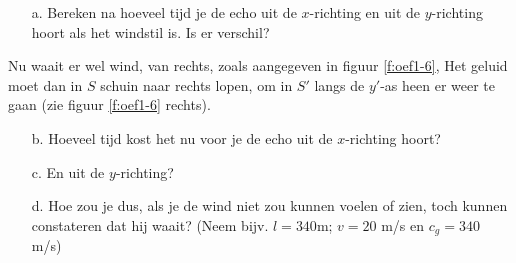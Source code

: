 \begin{itemize}
\item [a.]
  Bereken na hoeveel tijd je de echo uit de $x$-richting en 
  uit de $y$-richting hoort als het windstil is. Is er verschil? 
\end{itemize}
Nu  waait  er  wel  wind,  van  rechts, zoals aangegeven in figuur
\ref{f:oef1-6},
Het geluid moet dan in $S$ schuin naar rechts lopen, om in $S'$ langs 
de $y'$-as heen er weer te gaan (zie figuur \ref{f:oef1-6} rechts).
\begin{itemize}
\item [b.]
Hoeveel tijd kost het nu voor je de echo uit de $x$-richting hoort?
\item [c.]
  En uit de $y$-richting?
\item [d.]
Hoe zou je dus, als je de wind niet zou kunnen voelen of zien, toch kunnen 
constateren dat hij waait? (Neem bijv. $l = 340$m; $v = 20$ m/s en $c_{g} = 340$ m/s)
\end{itemize}

